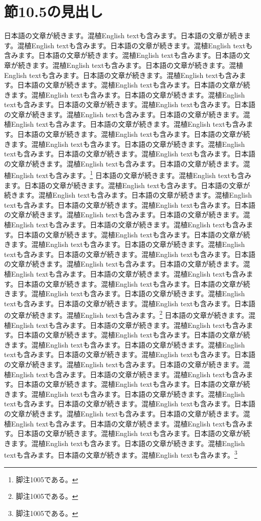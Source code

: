 \documentclass[pdflatex,book]{jlreq}
\begin{document}
\section{節10.5の見出し}
日本語の文章が続きます。混植English textも含みます。日本語の文章が続きます。混植English textも含みます。日本語の文章が続きます。混植English textも含みます。日本語の文章が続きます。混植English textも含みます。日本語の文章が続きます。混植English textも含みます。日本語の文章が続きます。混植English textも含みます。日本語の文章が続きます。混植English textも含みます。日本語の文章が続きます。混植English textも含みます。日本語の文章が続きます。混植English textも含みます。日本語の文章が続きます。混植English textも含みます。日本語の文章が続きます。混植English textも含みます。日本語の文章が続きます。混植English textも含みます。日本語の文章が続きます。混植English textも含みます。日本語の文章が続きます。混植English textも含みます。日本語の文章が続きます。混植English textも含みます。日本語の文章が続きます。混植English textも含みます。日本語の文章が続きます。混植English textも含みます。日本語の文章が続きます。混植English textも含みます。日本語の文章が続きます。混植English textも含みます。日本語の文章が続きます。混植English textも含みます。\footnote{脚注1005である。}
日本語の文章が続きます。混植English textも含みます。日本語の文章が続きます。混植English textも含みます。日本語の文章が続きます。混植English textも含みます。日本語の文章が続きます。混植English textも含みます。日本語の文章が続きます。混植English textも含みます。日本語の文章が続きます。混植English textも含みます。日本語の文章が続きます。混植English textも含みます。日本語の文章が続きます。混植English textも含みます。日本語の文章が続きます。混植English textも含みます。日本語の文章が続きます。混植English textも含みます。日本語の文章が続きます。混植English textも含みます。日本語の文章が続きます。混植English textも含みます。日本語の文章が続きます。混植English textも含みます。日本語の文章が続きます。混植English textも含みます。日本語の文章が続きます。混植English textも含みます。日本語の文章が続きます。混植English textも含みます。日本語の文章が続きます。混植English textも含みます。日本語の文章が続きます。混植English textも含みます。日本語の文章が続きます。混植English textも含みます。日本語の文章が続きます。混植English textも含みます。\footnote{脚注1005である。}
日本語の文章が続きます。混植English textも含みます。日本語の文章が続きます。混植English textも含みます。日本語の文章が続きます。混植English textも含みます。日本語の文章が続きます。混植English textも含みます。日本語の文章が続きます。混植English textも含みます。日本語の文章が続きます。混植English textも含みます。日本語の文章が続きます。混植English textも含みます。日本語の文章が続きます。混植English textも含みます。日本語の文章が続きます。混植English textも含みます。日本語の文章が続きます。混植English textも含みます。日本語の文章が続きます。混植English textも含みます。日本語の文章が続きます。混植English textも含みます。日本語の文章が続きます。混植English textも含みます。日本語の文章が続きます。混植English textも含みます。日本語の文章が続きます。混植English textも含みます。日本語の文章が続きます。混植English textも含みます。日本語の文章が続きます。混植English textも含みます。日本語の文章が続きます。混植English textも含みます。日本語の文章が続きます。混植English textも含みます。日本語の文章が続きます。混植English textも含みます。\footnote{脚注1005である。}
\end{document}

